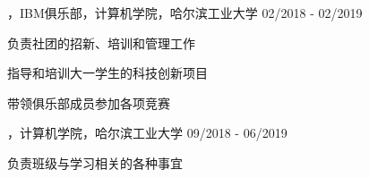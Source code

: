 
\begin{cventries}

\cvexperience
{，IBM俱乐部，计算机学院，哈尔滨工业大学}
{02/2018 - 02/2019}
{
    \begin{cvitems}
    \item {负责社团的招新、培训和管理工作}
    \item {指导和培训大一学生的科技创新项目}
    \item {带领俱乐部成员参加各项竞赛}
    \end{cvitems}
}

\cvexperience
{，计算机学院，哈尔滨工业大学}
{09/2018 - 06/2019}
{
	\begin{cvitems}
		\item {负责班级与学习相关的各种事宜}
	\end{cvitems}
}

\end{cventries}